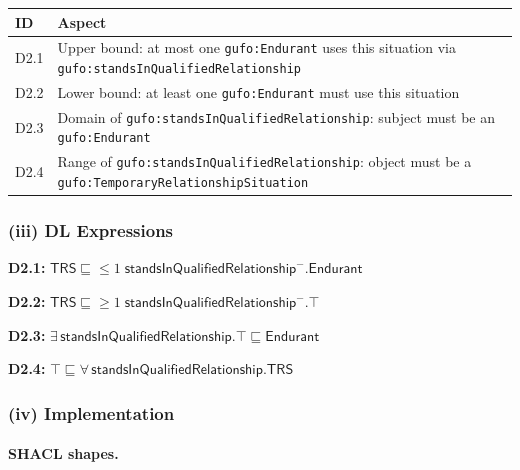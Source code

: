 \documentclass[12pt,a4paper]{article}
\newcommand{\gufoclass}[1]{\nolinkurl{gufo:#1}}
\newcommand{\gufoprop}[1]{\nolinkurl{gufo:#1}}
\begin{document}
\begin{tabular}{lL{9.5cm}}
  \toprule
  \textbf{ID} & \textbf{Aspect} \\
  \midrule
  D2.1 & Upper bound: at most one \gufoclass{Endurant} uses this situation via
         \gufoprop{standsInQualifiedRelationship} \\
  D2.2 & Lower bound: at least one \gufoclass{Endurant} must use this situation \\
  D2.3 & Domain of \gufoprop{standsInQualifiedRelationship}: subject must be
         an \gufoclass{Endurant} \\
  D2.4 & Range of \gufoprop{standsInQualifiedRelationship}: object must be a
         \gufoclass{TemporaryRelationshipSituation} \\
  \bottomrule
\end{tabular}

\subsubsection*{(iii) DL Expressions}

\textbf{D2.1:}
$\mathsf{TRS} \sqsubseteq {\leq}1\;\mathsf{standsInQualifiedRelationship}^{-}.\mathsf{Endurant}$

\textbf{D2.2:}
$\mathsf{TRS} \sqsubseteq {\geq}1\;\mathsf{standsInQualifiedRelationship}^{-}.\top$

\textbf{D2.3:}
$\exists\,\mathsf{standsInQualifiedRelationship}.\top \sqsubseteq \mathsf{Endurant}$

\textbf{D2.4:}
$\top \sqsubseteq \forall\,\mathsf{standsInQualifiedRelationship}.\mathsf{TRS}$

\subsubsection*{(iv) Implementation}

\paragraph{SHACL shapes.}
\end{document}
